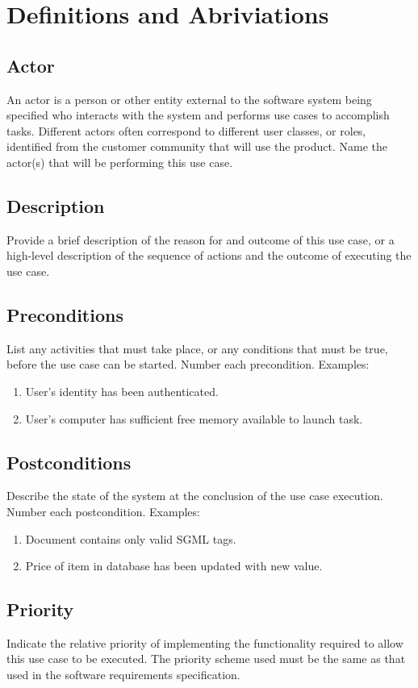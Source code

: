 \documentclass[a4paper]{article}
\begin{document}
\section{Definitions and Abriviations}

\subsection{Actor}
An actor is a person or other entity external to the software system being specified who interacts with the system and performs use cases to accomplish tasks. Different actors often correspond to different user classes, or roles, identified from the customer community that will use the product. Name the actor(s) that will be performing this use case.
\subsection{Description}
Provide a brief description of the reason for and outcome of this use case, or a high-level description of the sequence of actions and the outcome of executing the use case.
\subsection{Preconditions}
List any activities that must take place, or any conditions that must be true, before the use case can be started. Number each precondition. Examples:
\begin{enumerate}
	\item User’s identity has been authenticated.
	\item User’s computer has sufficient free memory available to launch task.
\end{enumerate}
\subsection{Postconditions}
Describe the state of the system at the conclusion of the use case execution. Number each postcondition. Examples:
\begin{enumerate}
	\item Document contains only valid SGML tags.
	\item Price of item in database has been updated with new value.
\end{enumerate}
\subsection{Priority}
Indicate the relative priority of implementing the functionality required to allow this use case to be executed. The priority scheme used must be the same as that used in the software requirements specification.
\end{document}
